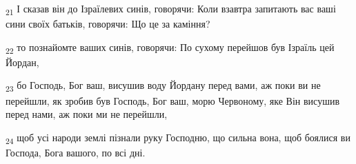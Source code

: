 \begin{tcolorbox}
\textsubscript{21} І сказав він до Ізраїлевих синів, говорячи: Коли взавтра запитають вас ваші сини своїх батьків, говорячи: Що це за каміння?
\end{tcolorbox}
\begin{tcolorbox}
\textsubscript{22} то познайомте ваших синів, говорячи: По сухому перейшов був Ізраїль цей Йордан,
\end{tcolorbox}
\begin{tcolorbox}
\textsubscript{23} бо Господь, Бог ваш, висушив воду Йордану перед вами, аж поки ви не перейшли, як зробив був Господь, Бог ваш, морю Червоному, яке Він висушив перед нами, аж поки ми не перейшли,
\end{tcolorbox}
\begin{tcolorbox}
\textsubscript{24} щоб усі народи землі пізнали руку Господню, що сильна вона, щоб боялися ви Господа, Бога вашого, по всі дні.
\end{tcolorbox}
